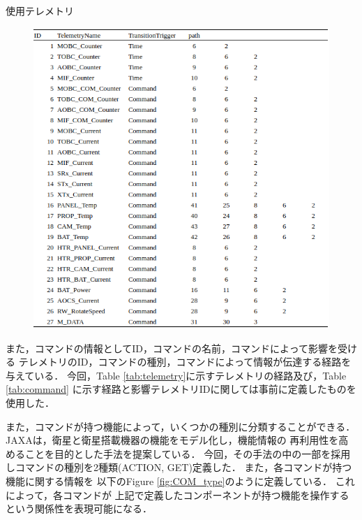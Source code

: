 \documentclass[11pt]{article}
\begin{document}
\newpage
\begin{table}[H]
   \centering
   \caption{使用テレメトリ}
   \label{tab:telemetry}
\end{table}
\vspace{-2zh}
\begin{figure}[H]
   \centering
      \includegraphics[width=14.0cm]{figure/TEL.png}
\end{figure}

また，コマンドの情報としてID，コマンドの名前，コマンドによって影響を受ける
テレメトリのID，コマンドの種別，コマンドによって情報が伝達する経路を与えている．
今回，Table \ref{tab:telemetry}に示すテレメトリの経路及び，Table \ref{tab:command}
に示す経路と影響テレメトリIDに関しては事前に定義したものを使用した．

また，コマンドが持つ機能によって，いくつかの種別に分類することができる．
JAXA\cite{JAXA2020}は，衛星と衛星搭載機器の機能をモデル化し，機能情報の
再利用性を高めることを目的とした手法を提案している．
今回，その手法の中の一部を採用しコマンドの種別を2種類(ACTION, GET)定義した．
また，各コマンドが持つ機能に関する情報を
以下のFigure \ref{fig:COM_type}のように定義している．
これによって，各コマンドが
上記で定義したコンポーネントが持つ機能を操作するという関係性を表現可能になる．
\end{document}
